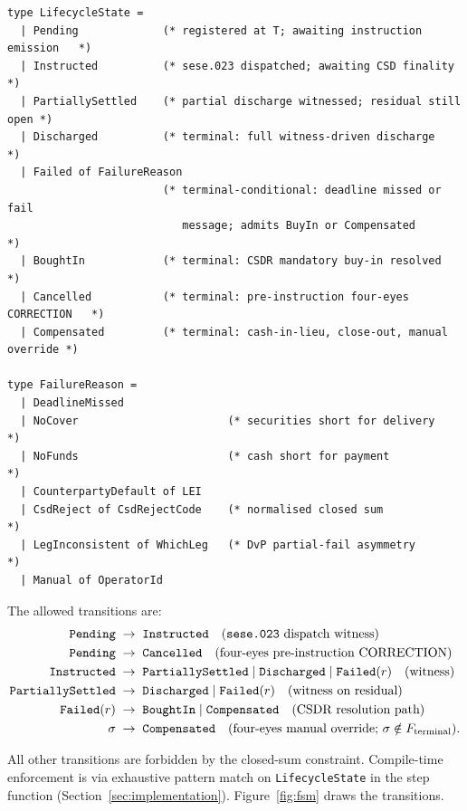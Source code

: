 \documentclass[11pt,a4paper]{article}
\begin{document}
\begin{lstlisting}
type LifecycleState =
  | Pending             (* registered at T; awaiting instruction emission   *)
  | Instructed          (* sese.023 dispatched; awaiting CSD finality       *)
  | PartiallySettled    (* partial discharge witnessed; residual still open *)
  | Discharged          (* terminal: full witness-driven discharge          *)
  | Failed of FailureReason
                        (* terminal-conditional: deadline missed or fail
                           message; admits BuyIn or Compensated             *)
  | BoughtIn            (* terminal: CSDR mandatory buy-in resolved         *)
  | Cancelled           (* terminal: pre-instruction four-eyes CORRECTION   *)
  | Compensated         (* terminal: cash-in-lieu, close-out, manual override *)

type FailureReason =
  | DeadlineMissed
  | NoCover                       (* securities short for delivery   *)
  | NoFunds                       (* cash short for payment          *)
  | CounterpartyDefault of LEI
  | CsdReject of CsdRejectCode    (* normalised closed sum           *)
  | LegInconsistent of WhichLeg   (* DvP partial-fail asymmetry      *)
  | Manual of OperatorId
\end{lstlisting}

The allowed transitions are:
\begin{align*}
\mathtt{Pending}      &\;\to\; \mathtt{Instructed}                                  \quad\text{(\texttt{sese.023} dispatch witness)} \\
\mathtt{Pending}      &\;\to\; \mathtt{Cancelled}                                   \quad\text{(four-eyes pre-instruction CORRECTION)} \\
\mathtt{Instructed}   &\;\to\; \mathtt{PartiallySettled} \mid \mathtt{Discharged} \mid \mathtt{Failed}(r) \quad\text{(witness)} \\
\mathtt{PartiallySettled} &\;\to\; \mathtt{Discharged} \mid \mathtt{Failed}(r)      \quad\text{(witness on residual)} \\
\mathtt{Failed}(r)    &\;\to\; \mathtt{BoughtIn} \mid \mathtt{Compensated}          \quad\text{(CSDR resolution path)} \\
\sigma                &\;\to\; \mathtt{Compensated}                                 \quad\text{(four-eyes manual override; }\sigma \notin F_{\mathrm{terminal}}\text{)}.
\end{align*}

All other transitions are forbidden by the closed-sum constraint. Compile-time enforcement is via exhaustive pattern match on \texttt{LifecycleState} in the step function (Section~\ref{sec:implementation}). Figure~\ref{fig:fsm} draws the transitions.
\end{document}
